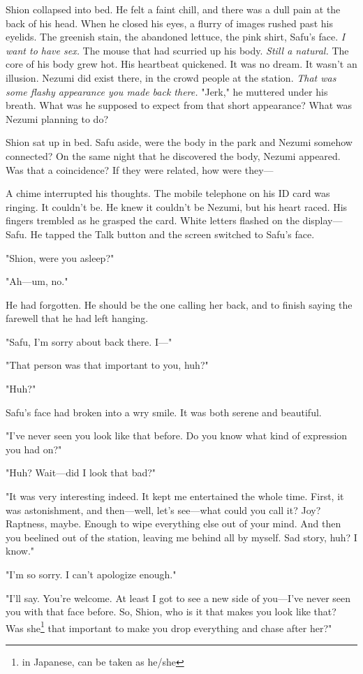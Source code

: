 Shion collapsed into bed. He felt a faint chill, and there was a dull
pain at the back of his head. When he closed his eyes, a flurry of
images rushed past his eyelids. The greenish stain, the abandoned
lettuce, the pink shirt, Safu's face. \emph{I want to have sex.} The mouse that
had scurried up his body. \emph{Still a natural.} The core of his body grew
hot. His heartbeat quickened. It was no dream. It wasn't an illusion.
Nezumi did exist there, in the crowd people at the station. \emph{That was
some flashy appearance you made back there.} "Jerk," he muttered under
his breath. What was he supposed to expect from that short appearance?
What was Nezumi planning to do?

Shion sat up in bed. Safu aside, were the body in the park and Nezumi
somehow connected? On the same night that he discovered the body, Nezumi
appeared. Was that a coincidence? If they were related, how were they---

A chime interrupted his thoughts. The mobile telephone on his ID card
was ringing. It couldn't be. He knew it couldn't be Nezumi, but his
heart raced. His fingers trembled as he grasped the card. White letters
flashed on the display---Safu. He tapped the Talk button and the screen
switched to Safu's face.

"Shion, were you asleep?"

"Ah---um, no."

He had forgotten. He should be the one calling her back, and to finish
saying the farewell that he had left hanging.

"Safu, I'm sorry about back there. I---"

"That person was that important to you, huh?"

"Huh?"

Safu's face had broken into a wry smile. It was both serene and
beautiful.

"I've never seen you look like that before. Do you know what kind of
expression you had on?"

"Huh? Wait---did I look that bad?"

"It was very interesting indeed. It kept me entertained the whole time.
First, it was astonishment, and then---well, let's see---what could you call
it? Joy? Raptness, maybe. Enough to wipe everything else out of your
mind. And then you beelined out of the station, leaving me behind all by
myself. Sad story, huh? I know."

"I'm so sorry. I can't apologize enough."

"I'll say. You're welcome. At least I got to see a new side of you---I've
never seen you with that face before. So, Shion, who is it that makes
you look like that? Was she\footnote{in Japanese, can be taken as he/she} that important to make you drop everything
and chase after her?"

